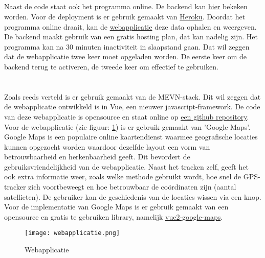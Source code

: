 \subsection{}
Naast de code staat ook het programma online. De backend kan \href{https://indy-bap-backend.herokuapp.com/api/locations}{\underline{hier}} bekeken worden. Voor de deployment is er gebruik gemaakt van \href{www.heroku.com}{Heroku}. Doordat het programma online draait, kan de \href{https://indy-bap-frontend.netlify.com/}{webapplicatie} deze data ophalen en weergeven.
\newline
De backend maakt gebruik van een gratis hosting plan, dat kan nadelig zijn. Het programma kan na 30 minuten inactiviteit in slaapstand gaan. Dat wil zeggen dat de webapplicatie twee keer moet opgeladen worden. De eerste keer om de backend terug te activeren, de tweede keer om effectief te gebruiken.
\pagebreak
\section{}
\label{ch:frontend}

\subsection{}
Zoals reeds verteld is er gebruik gemaakt van de MEVN-stack. Dit wil zeggen dat de webapplicatie ontwikkeld is in Vue, een nieuwer javascript-framework. De code van deze webapplicatie is opensource en staat online op \underline{\href{https://github.com/IndyVC/bap-frontend}{een github repository}}.
\newline
Voor de webapplicatie (zie figuur: \ref{fig:webapplicatie}) is er gebruik gemaakt van 'Google Maps'. Google Maps is een populaire online kaartendienst waarmee geografische locaties kunnen opgezocht worden waardoor dezelfde layout een vorm van betrouwbaarheid en herkenbaarheid geeft. Dit bevordert de gebruiksvriendelijkheid van de webapplicatie. Naast het tracken zelf, geeft het ook extra informatie weer, zoals welke methode gebruikt wordt, hoe snel de GPS-tracker zich voortbeweegt en hoe betrouwbaar de coördinaten zijn (aantal satellieten). De gebruiker kan de geschiedenis van de locaties wissen via een knop.
\newline
Voor de implementatie van Google Maps is er gebruik gemaakt van een opensource en gratis te gebruiken library, namelijk \href{https://www.npmjs.com/package/vue2-google-maps}{vue2-google-maps}.
\begin{figure}
	\texttt{[image: webapplicatie.png]}
	\caption{Webapplicatie}
	\label{fig:webapplicatie}
\end{figure}


